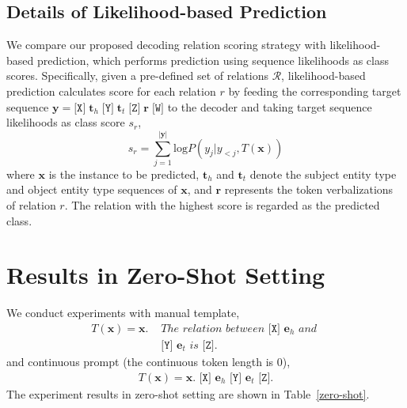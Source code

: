 \documentclass[11pt]{article}
\begin{document}
\subsection{Details of Likelihood-based Prediction}\label{D.4}
We compare our proposed decoding relation scoring strategy with likelihood-based prediction, which performs prediction using sequence likelihoods as class scores. Specifically, given a pre-defined set of relations $\mathcal{R}$, likelihood-based prediction calculates score for each relation $r$ by feeding the corresponding target sequence $\boldsymbol{y} =\texttt{[X]}\; \boldsymbol{t}_h \; \texttt{[Y]}\; \boldsymbol{t}_t \;\texttt{[Z]}\;  \boldsymbol{r}\; \texttt{[W]} $ to the decoder and taking target sequence likelihoods as class score $s_r$, 
\begin{equation*}
	s_r=\sum_{j=1}^{|\boldsymbol{y}|}\textrm{log}P(y_j|y_{<j}, T(\boldsymbol{x}))
\end{equation*}
where $\boldsymbol{x}$ is the instance to be predicted, $\boldsymbol{t}_h$ and $\boldsymbol{t}_t$ denote the subject entity type and object entity type sequences of $\boldsymbol{x}$, and $\boldsymbol{r}$ represents the token verbalizations of relation $r$. The relation with the highest score is regarded as the predicted class.
\section{Results in Zero-Shot Setting}\label{F}
We conduct experiments with manual template,
\begin{equation*}
\begin{aligned}
	T(\boldsymbol{x})=	\boldsymbol{x}.\, \,  &The\,\,  relation\,\,  between\,\, \texttt{[X]} \,\, \boldsymbol{e}_h\,\,  and\,\,  \\
	&\texttt{[Y]}\,\,  \boldsymbol{e}_t \,\, is \,\, \texttt{[Z]}.
\end{aligned}
\end{equation*}
and continuous prompt (the continuous token length is $0$),
\begin{equation*}
\begin{aligned}
	T(\boldsymbol{x})=\boldsymbol{x}.\, \,  \texttt{[X]} \,\, \boldsymbol{e}_h\,\, \texttt{[Y]}\,\,  \boldsymbol{e}_t \,\, \texttt{[Z]}.
\end{aligned}
\end{equation*}
The experiment results in zero-shot setting are shown in Table~\ref{zero-shot}.
\end{document}
